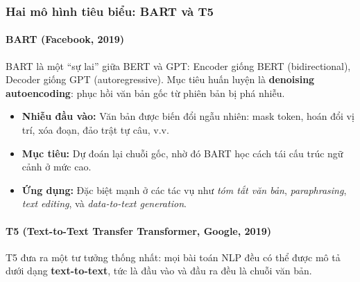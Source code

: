 \begin{center}
	\label{fig:transformer_encoder_decoder_full}
\end{center}

\subsubsection{Hai mô hình tiêu biểu: BART và T5}

\paragraph{BART (Facebook, 2019) \cite{lewis2019bart}}
BART là một “sự lai” giữa BERT và GPT:
Encoder giống BERT (bidirectional), Decoder giống GPT (autoregressive).
Mục tiêu huấn luyện là \textbf{denoising autoencoding}: phục hồi văn bản gốc từ phiên bản bị phá nhiễu.

\begin{itemize}
	\item \textbf{Nhiễu đầu vào:} Văn bản được biến đổi ngẫu nhiên: mask token, hoán đổi vị trí, xóa đoạn, đảo trật tự câu, v.v.
	\item \textbf{Mục tiêu:} Dự đoán lại chuỗi gốc, nhờ đó BART học cách tái cấu trúc ngữ cảnh ở mức cao.
	\item \textbf{Ứng dụng:} Đặc biệt mạnh ở các tác vụ như \textit{tóm tắt văn bản}, \textit{paraphrasing}, \textit{text editing},
	và \textit{data-to-text generation}.
\end{itemize}

\paragraph{T5 (Text-to-Text Transfer Transformer, Google, 2019) \cite{raffel2020exploring}}
T5 đưa ra một tư tưởng thống nhất:
mọi bài toán NLP đều có thể được mô tả dưới dạng \textbf{text-to-text},
tức là đầu vào và đầu ra đều là chuỗi văn bản.

